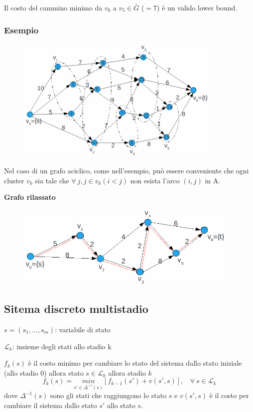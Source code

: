 Il costo del cammino minimo da $v_{0}$ a $v_{5}\in\bar{G}$ ($ =7$) è un valido lower bound.

\subsubsection{Esempio}
\begin{figure}[!h]
	\centering
	\includegraphics[height=6cm]{images/graph44.png}
\end{figure}
Nel caso di un grafo aciclico, come nell'esempio, può essere conveniente che ogni cluster $v_{k}$ sia tale che $\forall\ j,j\in v_{k}(i<j)$ non esista l'arco $(i,j)$ in A.

\textbf{Grafo rilassato}\\
\begin{figure}[H]
	\centering
	\includegraphics[height=4cm]{images/graph45.png}
\end{figure}

\subsection{Sitema discreto multistadio}
$s=(s_{1},\dots,s_{m})$: variabile di stato

$\mathscr{L}_{k}$: insieme degli stati allo stadio k

$f_{k}(s)$ è il costo minimo per cambiare lo stato del sistema dallo stato iniziale (allo stadio $0$) allora stato $s\in\mathscr{L}_{k}$ allora stadio $k$
\begin{equation*}
	f_{k}(s)=\underset{s'\in\Delta^{-1}(s)}{min}[f_{k-1}(s')+v(s',s)],\ \ \ \ \forall\ s\in\mathscr{L}_{k}
\end{equation*}
dove $\Delta^{-1}(s)$ sono gli stati che raggiungono lo stato $s$ e $v(s',s)$ è il costo per cambiare il sistema dallo stato $s'$ allo stato $s$.

